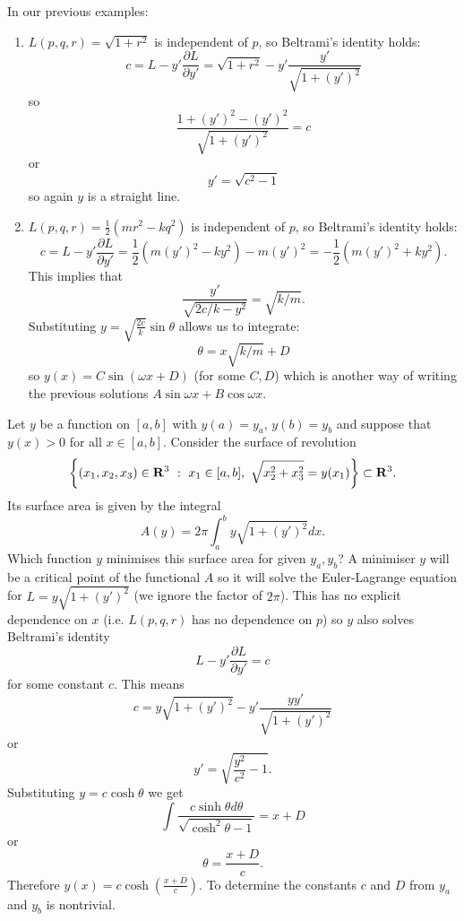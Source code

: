 \begin{exm}
In our previous examples:
\begin{enumerate}
\item $L(p,q,r)=\sqrt{1+r^2}$ is independent of $p$, so Beltrami's identity holds:
\[c=L-y'\frac{\partial L}{\partial y'}=\sqrt{1+r^2}-y'\frac{y'}{\sqrt{1+(y')^2}}\]
so
\[\frac{1+(y')^2-(y')^2}{\sqrt{1+(y')^2}}=c\]
or
\[y'=\sqrt{c^2-1}\]
so again $y$ is a straight line.
\item $L(p,q,r)=\frac{1}{2}(mr^2-kq^2)$ is independent of $p$, so Beltrami's identity holds:
\[c=L-y'\frac{\partial L}{\partial y'}=\frac{1}{2}(m(y')^2-ky^2)-m(y')^2=-\frac{1}{2}(m(y')^2+ky^2).\]
This implies that
\[\frac{y'}{\sqrt{2c/k-y^2}}=\sqrt{k/m}.\]
Substituting $y=\sqrt{\frac{2c}{k}}\sin\theta$ allows us to integrate:
\[\theta=x\sqrt{k/m}+D\]
so $y(x)=C\sin(\omega x+D)$ (for some $C,D$) which is another way of writing the previous solutions $A\sin\omega x+B\cos\omega x$.
\end{enumerate}
\end{exm}
\begin{exm}[Catenoid]
Let $y$ be a function on $[a,b]$ with $y(a)=y_a$, $y(b)=y_b$ and suppose that $y(x)>0$ for all $x\in[a,b]$. Consider the surface of revolution
\[\left\{(x_1,x_2,x_3)\in\RR^3\ :\ x_1\in[a,b],\ \sqrt{x_2^2+x_3^2}=y(x_1)\right\}\subset\RR^3.\]
Its surface area is given by the integral
\[A(y)=2\pi\int_a^by\sqrt{1+(y')^2}dx.\]
Which function $y$ minimises this surface area for given $y_a,y_b$? A minimiser $y$ will be a critical point of the functional $A$ so it will solve the Euler-Lagrange equation for $L=y\sqrt{1+(y')^2}$ (we ignore the factor of $2\pi$). This has no explicit dependence on $x$ (i.e. $L(p,q,r)$ has no dependence on $p$) so $y$ also solves Beltrami's identity
\[L-y'\frac{\partial L}{\partial y'}=c\]
for some constant $c$. This means
\[c=y\sqrt{1+(y')^2}-y'\frac{yy'}{\sqrt{1+(y')^2}}\]
or
\[y'=\sqrt{\frac{y^2}{c^2}-1}.\]
Substituting $y=c\cosh\theta$ we get
\[\int\frac{c\sinh\theta d\theta}{\sqrt{\cosh^2\theta-1}}=x+D\]
or
\[\theta=\frac{x+D}{c}.\]
Therefore $y(x)=c\cosh\left(\frac{x+D}{c}\right)$. To determine the constants $c$ and $D$ from $y_a$ and $y_b$ is nontrivial.
\end{exm}
